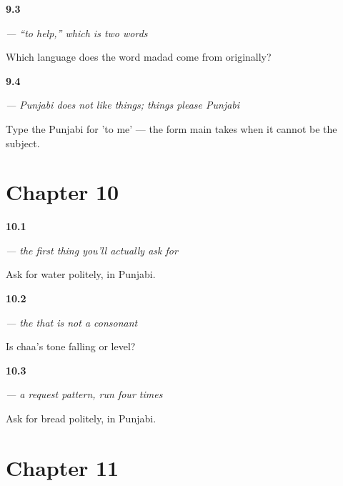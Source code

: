 \noindent\begin{minipage}[t]{\linewidth}
\raggedright
\hypertarget{review-PA-C09-madad-karna-root}{\textbf{9.3}} \emph{  — “to help,” which is two words}\par
\small Which language does the word madad come from originally?
\end{minipage}\par\medskip

\noindent\begin{minipage}[t]{\linewidth}
\raggedright
\hypertarget{review-PA-C09-pasand-dative}{\textbf{9.4}} \emph{ — Punjabi does not like things; things please Punjabi}\par
\small Type the Punjabi for 'to me' — the form main takes when it cannot be the subject.
\end{minipage}\par\medskip

\section*{Chapter 10}

\noindent\begin{minipage}[t]{\linewidth}
\raggedright
\hypertarget{review-PA-C10-paani-please}{\textbf{10.1}} \emph{ — the first thing you'll actually ask for}\par
\small Ask for water politely, in Punjabi.
\end{minipage}\par\medskip

\noindent\begin{minipage}[t]{\linewidth}
\raggedright
\hypertarget{review-PA-C10-chaa-tone}{\textbf{10.2}} \emph{ — the  that is not a consonant}\par
\small Is chaa's tone falling or level?
\end{minipage}\par\medskip

\noindent\begin{minipage}[t]{\linewidth}
\raggedright
\hypertarget{review-PA-C10-roti-requests}{\textbf{10.3}} \emph{ — a request pattern, run four times}\par
\small Ask for bread politely, in Punjabi.
\end{minipage}\par\medskip

\section*{Chapter 11}

